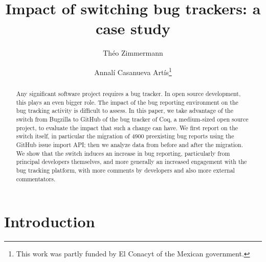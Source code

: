 \documentclass[runningheads]{llncs}
\begin{document}
%
\title{Impact of switching bug trackers: a case study}
%
%
\author{Th\'eo Zimmermann \and
Annal\'i Casanueva Art\'is\thanks{This work was partly funded by El Conacyt of the Mexican government.}}
%
%
%
\maketitle              %
%
\begin{abstract}
Any significant software project requires a bug tracker. In open source development, this plays an even bigger role. The impact of the bug reporting environment on the bug tracking activity is difficult to assess. In this paper, we take advantage of the switch from Bugzilla to GitHub of the bug tracker of Coq, a medium-sized open source project, to evaluate the impact that such a change can have. 
We first report on the switch itself, in particular the migration of 4900 preexisting bug reports using the GitHub issue import API; then we analyze data from before and after the migration. We show that the switch induces 
an increase in bug reporting, particularly from principal developers themselves, and more generally an increased engagement with the bug tracking platform, with more comments by developers and also more external commentators.


\end{abstract}
%
%
%
\section{Introduction}
\end{document}
